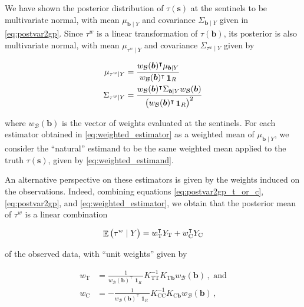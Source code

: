 \documentclass[letter]{article}
\DeclareMathOperator{\E}{\mathbb{E}}
\DeclareMathOperator{\ones}{\mathbf{1}}
\newcommand{\trans}{^{\intercal}}
\newcommand{\treat}{\mathrm{T}}
\newcommand{\ctrol}{\mathrm{C}}
\newcommand{\svec}{\mathbold{s}}
\newcommand{\border}{\mathcal{B}}
\newcommand{\sentinels}{\bm{b}}
\newcommand{\tauw}{\tau^{w}}
\newcommand{\eqlabel}[1]{\label{#1}}
\newcommand{\numsent}{R}
\newcommand{\weightb}{w_{\border}}
\newcommand{\wt}{w_{\treat}}
\newcommand{\wc}{w_{\ctrol}}
\begin{document}
We have shown the posterior distribution of \(\tau(\svec)\) at the sentinels to be multivariate normal, with mean \(\mu_{\sentinels \mid Y}\) and covariance \(\Sigma_{\sentinels \mid Y}\) given in \eqref{eq:postvar2gp}.
Since \(\tauw\) is a linear transformation of \(\tau(\sentinels)\), its posterior is also multivariate normal, with mean \(\mu_{\tauw \mid Y}\) and covariance \(\Sigma_{\tauw \mid Y}\) given by

\begin{equation}\begin{split}
    \mu_{\tauw \mid Y} &= \frac{\weightb(\sentinels)\trans \mu_{\sentinels \mid Y}}
                               {\weightb(\sentinels)\trans  \ones_\numsent} \\
    \Sigma_{\tauw \mid Y} &= \frac{\weightb(\sentinels)\trans \Sigma_{\sentinels \mid Y} \weightb(\sentinels)}
                                  { \del{\weightb(\sentinels)\trans  \ones_\numsent }^2 }\\
\end{split}
\eqlabel{eq:weighted_estimator}
\end{equation}

where \(\weightb(\sentinels)\) is the vector of weights evaluated at the sentinels.
For each estimator obtained in \eqref{eq:weighted_estimator} as a weighted mean of \(\mu_{\sentinels \mid Y}\), we consider the ``natural'' estimand to be the same weighted mean applied to the truth \(\tau(\svec)\), given by \eqref{eq:weighted_estimand}.

An alternative perspective on these estimators is given by the weights induced on the observations.
Indeed, combining equations \eqref{eq:postvar2gp_t_or_c}, \eqref{eq:postvar2gp}, and \eqref{eq:weighted_estimator}, we obtain that the posterior mean of \(\tauw\) is a linear combination

\begin{equation}
\E\del{\tauw \mid Y} = \wt\trans Y_\treat + \wc\trans Y_\ctrol
\eqlabel{eq:unit_weights}
\end{equation}

of the observed data, with ``unit weights'' given by

\begin{equation}
\begin{split}
\wt &= \frac{1}{\weightb(\sentinels)\trans \ones_{\numsent}}
K_{\treat \treat}^{-1} K_{\treat \sentinels} \weightb(\sentinels) \,, \text{ and}
\\
\wc &= -\frac{1}{\weightb(\sentinels)\trans \ones_{\numsent}} 
K_{\ctrol \ctrol}^{-1} K_{\ctrol \sentinels} \weightb(\sentinels) \,,
\end{split}
\end{equation}
\end{document}
